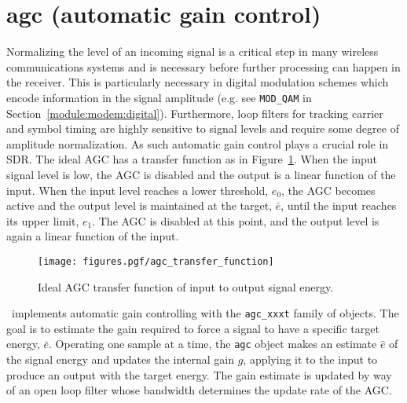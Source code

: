 % 
%

\newpage
\section{agc (automatic gain control)}
\label{module:agc}
Normalizing the level of an incoming signal is a critical step in
many wireless communications systems
and is necessary before further processing can happen in the receiver.
This is particularly necessary in digital
modulation schemes which encode information in the signal amplitude
(e.g. see {\tt MOD\_QAM} in Section~\ref{module:modem:digital}).
Furthermore, loop filters for tracking carrier and symbol timing are highly
sensitive to signal levels and require some degree of amplitude
normalization.
As such automatic gain control plays a crucial role in SDR.
The ideal AGC has a transfer function as in
Figure~\ref{fig:module:agc:transfer_function}.
When the input signal level is low, the AGC is disabled and the output is a
linear function of the input.
When the input level reaches a lower threshold, $e_0$, the AGC becomes active
and the output level is maintained at the target, $\bar{e}$, until the input
reaches its upper limit, $e_1$.
The AGC is disabled at this point, and the output level is again a linear
function of the input.

\begin{figure}
\centering
  \texttt{[image: figures.pgf/agc\_transfer\_function]}
\caption{Ideal AGC transfer function of input to output signal energy.}
\label{fig:module:agc:transfer_function}
\end{figure}

\liquid\ implements automatic gain controlling with the {\tt agc\_xxxt}
family of objects.
The goal is to estimate the gain required to force a signal to have a specific
target energy, $\bar{e}$.
Operating one sample at a time, the {\tt agc} object makes an estimate
$\hat{e}$ of the signal energy and updates the internal gain $g$,
applying it to the input to produce an output with the target energy.
The gain estimate is updated by way of an open loop filter whose bandwidth
determines the update rate of the AGC.

